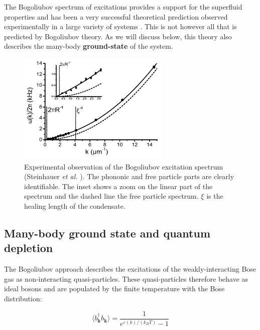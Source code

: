 The Bogoliubov spectrum of excitations provides a support for the superfluid properties and has been a very successful theoretical prediction observed experimentally in a large variety of systems \cite{fontaine2018,miller1962,ozeri2005,steinhauer2002excitation,stepanov2019}. This is not however all that is predicted by Bogoliubov theory. As we will discuss below, this theory also describes  the many-body \textbf{ground-state} of the system.

\begin{figure}
    \centering
    \includegraphics[width=0.65\textwidth]{Fig/Chapter1/bogo_steinhauer.png}
    \caption[Experimental observation of the Bogoliubov excitation spectrum]{Experimental observation of the Bogoliubov excitation spectrum (Steinhauer {\it et al.} \cite{steinhauer2002excitation}). The phononic and free particle parts are clearly identifiable. The inset shows a zoom on the linear part of the spectrum and the dashed line the free particle spectrum. $\xi$ is the healing length of the condensate.}
    \label{fig:my_label}
\end{figure}

\subsection{Many-body ground state and quantum depletion}

\label{sec:many_body_ground_state}

The Bogoliubov approach describes the excitations of the weakly-interacting Bose gas as non-interacting quasi-particles. These quasi-particles therefore behave as ideal bosons and are populated by the finite temperature with the Bose distribution:

\begin{equation}
    \langle b^{\dagger}_{\bm{k}}  b_{\bm{k}} \rangle=\frac{1}{e^{\varepsilon(k)/(k_B T)}-1} 
    \label{eq:bose_qp}
\end{equation}

